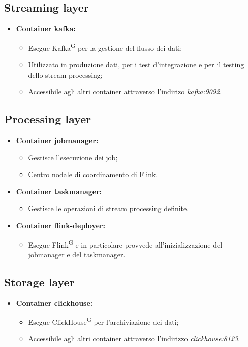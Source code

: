 \documentclass[8pt]{article}
\newcommand{\glossterm}[1]{#1\textsuperscript{G}} %
\begin{document}
\subsection{Streaming layer}
\begin{itemize}
    \item \textbf{Container kafka:}
    \begin{itemize}
        \item Esegue \glossterm{Kafka} per la gestione del flusso dei dati;
        \item Utilizzato in produzione dati, per i test d'integrazione e per il testing dello stream processing;
        \item Accessibile agli altri container attraverso l'indirizo \textit{kafka:9092}.
    \end{itemize}
\end{itemize}
\subsection{Processing layer}
\begin{itemize}
    \item \textbf{Container jobmanager:}
    \begin{itemize}
        \item Gestisce l'esecuzione dei job;
        \item Centro nodale di coordinamento di Flink.
    \end{itemize}
    \item \textbf{Container taskmanager:}
    \begin{itemize}
        \item Gestisce le operazioni di stream processing definite.
    \end{itemize}
    \item \textbf{Container flink-deployer:}
    \begin{itemize}
        \item Esegue \glossterm{Flink} e in particolare provvede all'inizializzazione del jobmanager e del taskmanager.
    \end{itemize}
\end{itemize}
\subsection{Storage layer}
\begin{itemize}
    \item \textbf{Container clickhouse:}
    \begin{itemize}
        \item Esegue \glossterm{ClickHouse} per l'archiviazione dei dati;
        \item Accessibile agli altri container attraverso l'indirizzo \textit{clickhouse:8123}.
    \end{itemize}
\end{itemize}
\end{document}
